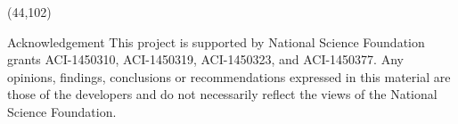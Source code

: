 \documentclass[final]{beamer}
\begin{document}
\begin{frame}{}

\begin{textblock}{38.0}(44,102)
\begin{block}{Acknowledgement}
This project is supported by National Science Foundation grants ACI-1450310, ACI-1450319, ACI-1450323, and ACI-1450377. Any opinions, findings, conclusions or recommendations expressed in this material are those of the developers and do not necessarily reflect the views of the National Science Foundation.
\end{block}
\end{textblock}




\end{frame}
\end{document}
